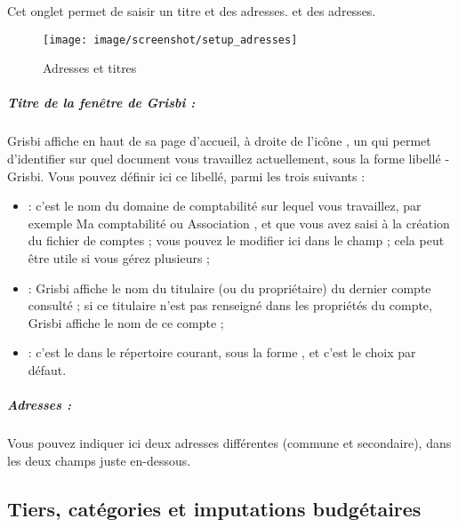 Cet onglet permet de saisir un titre \ifIllustration et des adresses.
\else et des adresses.
\fi

\ifIllustration
\begin{figure}[htbp]
\begin{center}
\texttt{[image: image/screenshot/setup\_adresses]}
\end{center}
\caption{Adresses et titres}
\label{setup-adresses-img}
\end{figure}
\fi


\subparagraph{Titre de la fenêtre de Grisbi :\label{setup-display-addresses-titles}}

Grisbi affiche en haut de sa page d'accueil, à droite de l'icône , un  qui permet d'identifier sur quel document vous travaillez actuellement, sous la forme \og libellé - Grisbi\fg{}. Vous pouvez définir ici ce libellé, parmi les trois suivants :

\begin{itemize}
	\item {} : c'est le nom du domaine de comptabilité sur lequel vous travaillez, par exemple \og Ma comptabilité \fg{} ou \og Association \fg{}, et que vous avez saisi à la création du fichier de comptes ; vous pouvez le modifier ici dans le champ  ; cela peut être utile si vous gérez plusieurs  ;
	\item {} : Grisbi affiche le nom du titulaire (ou du propriétaire) du dernier compte consulté ; si ce titulaire n'est pas renseigné dans les propriétés du compte, Grisbi affiche le nom de ce compte ;
	\item {} : c'est le  dans le répertoire courant, sous la forme , et c'est le choix par défaut.
\end{itemize}


\subparagraph{Adresses :\label{setup-display-addresses-address}}

Vous pouvez indiquer ici deux adresses différentes (commune et secondaire), dans les deux champs juste en-dessous.


\subsection{Tiers, catégories et imputations budgétaires\label{setup-display-third}}

